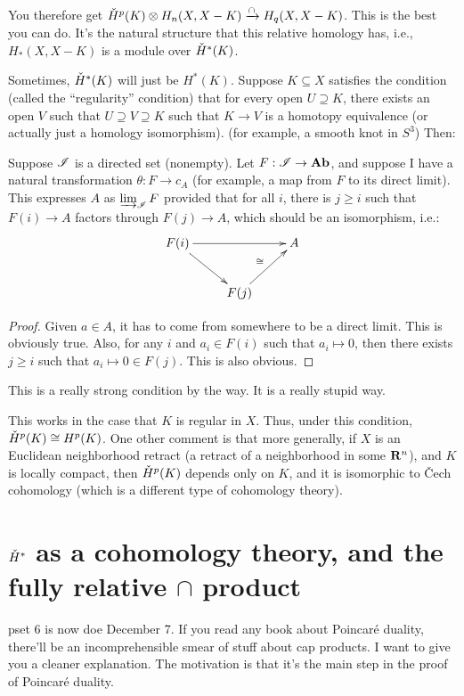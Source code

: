 You therefore get $\check{H}^p(K)\otimes H_n(X,X-K)\xrightarrow{\cap} H_q(X,X-K)$. This is the best you can do. It's the natural structure that this relative homology has, i.e., $ H_\ast(X,X-K)$ is a module over $\check{H}^\ast(K)$.

Sometimes, $\check{H}^\ast(K)$ will just be $ H^\ast(K)$. Suppose $K\subseteq X$ satisfies the condition (called the ``regularity'' condition) that for every open $U\supseteq K$, there exists an open $V$ such that $U\supseteq V\supseteq K$ such that $K\to V$ is a homotopy equivalence (or actually just a homology isomorphism). (for example, a smooth knot in $S^3$) Then:
\begin{lemma}
Suppose $\mathscr I$ is a directed set (nonempty). Let $F:\mathscr I\to\mathbf{Ab}$, and suppose I have a natural transformation $\theta:F\to c_A$ (for example, a map from $F$ to its direct limit). This expresses $A$ as $\varinjlim_\mathscr I F$ provided that for all $i$, there is $j\geq i$ such that $F(i)\to A$ factors through $F(j)\to A$, which should be an isomorphism, i.e.:
\begin{equation*}
\xymatrix{
	F(i)\ar[dr]\ar[rr] & & A\\
	& F(j)\ar[ur]^\cong
}
\end{equation*}
\end{lemma}
\begin{proof}
Given $a\in A$, it has to come from somewhere to be a direct limit. This is obviously true. Also, for any $i$ and $a_i\in F(i)$ such that $a_i\mapsto 0$, then there exists $j\geq i$ such that $a_i\mapsto 0\in F(j)$. This is also obvious.
\end{proof}
\begin{remark}
This is a really strong condition by the way. It is a really stupid way.
\end{remark}
This works in the case that $K$ is regular in $X$. Thus, under this condition, $\check{H}^p(K)\cong H^p(K)$. One other comment is that more generally, if $X$ is an Euclidean neighborhood retract (a retract of a neighborhood in some $\mathbf R^n$), and $K$ is locally compact, then $\check{H}^p(K)$ depends only on $K$, and it is isomorphic to \v{C}ech cohomology (which is a different type of cohomology theory).
\section{$\check{H}^\ast$ as a cohomology theory, and the fully relative $\cap$ product}
pset 6 is now doe December 7. If you read any book about Poincar\'{e} duality, there'll be an incomprehensible smear of stuff about cap products. I want to give you a cleaner explanation. The motivation is that it's the main step in the proof of Poincar\'{e} duality.

